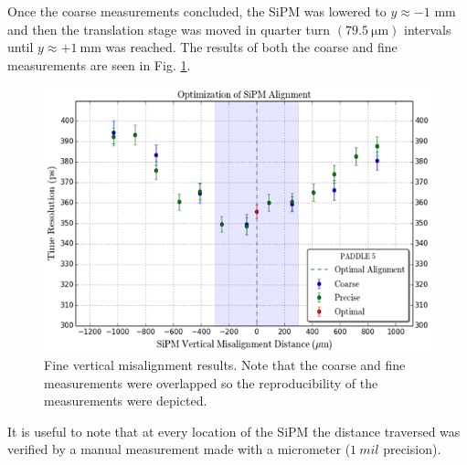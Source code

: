 Once the coarse measurements concluded, the SiPM was lowered to $y \approx -1$ mm and then the translation stage was moved in quarter turn $(79.5\ \mathrm{\mu m})$ intervals until $y \approx +1\ \mathrm{mm}$ was reached.  The results of both the coarse and fine measurements are seen in Fig. \ref{fig:sipm_va_fine}.
\begin{figure}[!htb]
	\centering
	\includegraphics[width=1.0\columnwidth]{misalignment/figs/sipm_va_fine}
	\caption{Fine vertical misalignment results.  Note that the coarse and fine measurements were overlapped so the reproducibility of the measurements were depicted.}
	\label{fig:sipm_va_fine}
\end{figure}
It is useful to note that at every location of the SiPM the distance traversed was verified by a manual measurement made with a micrometer ($1\ mil$ precision).

